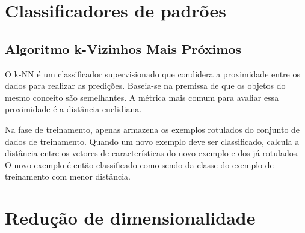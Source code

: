 \section{Classificadores de padrões}
\label{cap:classificadores}





\subsection{Algoritmo k-Vizinhos Mais Próximos}

O k-NN é um classificador supervisionado que condidera a proximidade entre os dados para realizar as predições. Baseia-se na premissa de que os objetos do mesmo conceito são semelhantes. A métrica mais comum para avaliar essa proximidade é a distância euclidiana.

Na fase de treinamento, apenas armazena os exemplos rotulados do conjunto de dados de treinamento. Quando um novo exemplo deve ser classificado, calcula a distância entre os vetores de características do novo exemplo e dos já rotulados. O novo exemplo é então classificado como sendo da classe do exemplo de treinamento com menor distância.

\section{Redução de dimensionalidade}
\label{sec:vis}

